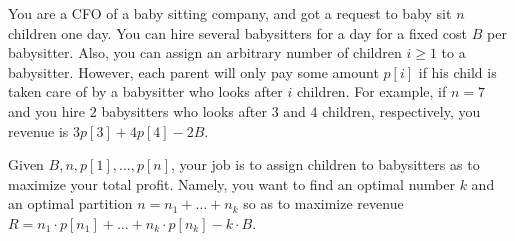 \documentclass[11pt]{article}
\begin{document}
\noindent
You are a CFO of a baby sitting company, and got a request to baby sit
$n$ children one day. You can hire several babysitters for a day for a
fixed cost $B$ per babysitter. Also, you can assign an arbitrary
number of children $i\ge 1$ to a babysitter. However, each parent will
only pay some amount $p[i]$ if his child is taken care of by a
babysitter who looks after $i$ children. For example, if $n=7$ and you
hire $2$ babysitters who looks after $3$ and $4$ children,
respectively, you revenue is $3p[3] + 4p[4] - 2B$.

Given $B,n,p[1],\ldots, p[n]$, your job is to assign children to
babysitters as to maximize your total profit. Namely, you want to find
an optimal number $k$ and an optimal partition $n=n_1+\ldots+n_k$ so
as to maximize revenue $R = n_1\cdot p[n_1]+\ldots+n_k \cdot p[n_k] -
k\cdot B$.
\end{document}
